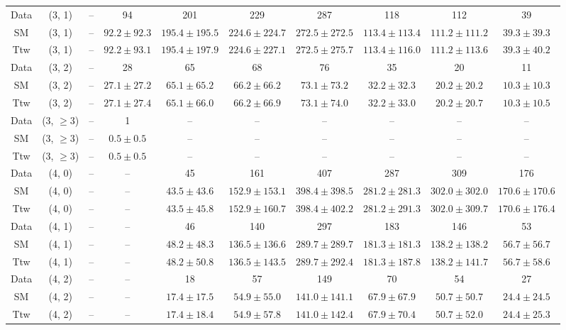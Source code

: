 \begin{table}[h!]
{\begin{tabular}{cccccccccc}
	Data & (3, 1) & -- & 94 & 201 & 229 & 287 & 118 & 112 & 39 \\[0.5ex] 
	SM & (3, 1) & -- & $92.2\pm 92.3$ & $195.4\pm 195.5$ & $224.6\pm 224.7$ & $272.5\pm 272.5$ & $113.4\pm 113.4$ & $111.2\pm 111.2$ & $39.3\pm 39.3$ \\[0.5ex] 
	Ttw & (3, 1) & -- & $92.2\pm 93.1$ & $195.4\pm 197.9$ & $224.6\pm 227.1$ & $272.5\pm 275.7$ & $113.4\pm 116.0$ & $111.2\pm 113.6$ & $39.3\pm 40.2$ \\[0.5ex] 
	Data & (3, 2) & -- & 28 & 65 & 68 & 76 & 35 & 20 & 11 \\[0.5ex] 
	SM & (3, 2) & -- & $27.1\pm 27.2$ & $65.1\pm 65.2$ & $66.2\pm 66.2$ & $73.1\pm 73.2$ & $32.2\pm 32.3$ & $20.2\pm 20.2$ & $10.3\pm 10.3$ \\[0.5ex] 
	Ttw & (3, 2) & -- & $27.1\pm 27.4$ & $65.1\pm 66.0$ & $66.2\pm 66.9$ & $73.1\pm 74.0$ & $32.2\pm 33.0$ & $20.2\pm 20.7$ & $10.3\pm 10.5$ \\[0.5ex] 
	Data & (3, $\ge3$) & -- & 1 & -- & -- & -- & -- & -- & -- \\[0.5ex] 
	SM & (3, $\ge3$) & -- & $0.5\pm 0.5$ & -- & -- & -- & -- & -- & -- \\[0.5ex] 
	Ttw & (3, $\ge3$) & -- & $0.5\pm 0.5$ & -- & -- & -- & -- & -- & -- \\[0.5ex] 
	Data & (4, 0) & -- & -- & 45 & 161 & 407 & 287 & 309 & 176 \\[0.5ex] 
	SM & (4, 0) & -- & -- & $43.5\pm 43.6$ & $152.9\pm 153.1$ & $398.4\pm 398.5$ & $281.2\pm 281.3$ & $302.0\pm 302.0$ & $170.6\pm 170.6$ \\[0.5ex] 
	Ttw & (4, 0) & -- & -- & $43.5\pm 45.8$ & $152.9\pm 160.7$ & $398.4\pm 402.2$ & $281.2\pm 291.3$ & $302.0\pm 309.7$ & $170.6\pm 176.4$ \\[0.5ex] 
	Data & (4, 1) & -- & -- & 46 & 140 & 297 & 183 & 146 & 53 \\[0.5ex] 
	SM & (4, 1) & -- & -- & $48.2\pm 48.3$ & $136.5\pm 136.6$ & $289.7\pm 289.7$ & $181.3\pm 181.3$ & $138.2\pm 138.2$ & $56.7\pm 56.7$ \\[0.5ex] 
	Ttw & (4, 1) & -- & -- & $48.2\pm 50.8$ & $136.5\pm 143.5$ & $289.7\pm 292.4$ & $181.3\pm 187.8$ & $138.2\pm 141.7$ & $56.7\pm 58.6$ \\[0.5ex] 
	Data & (4, 2) & -- & -- & 18 & 57 & 149 & 70 & 54 & 27 \\[0.5ex] 
	SM & (4, 2) & -- & -- & $17.4\pm 17.5$ & $54.9\pm 55.0$ & $141.0\pm 141.1$ & $67.9\pm 67.9$ & $50.7\pm 50.7$ & $24.4\pm 24.5$ \\[0.5ex] 
	Ttw & (4, 2) & -- & -- & $17.4\pm 18.4$ & $54.9\pm 57.8$ & $141.0\pm 142.4$ & $67.9\pm 70.4$ & $50.7\pm 52.0$ & $24.4\pm 25.3$ \\[0.5ex] 

\end{tabular}}
\end{table}
